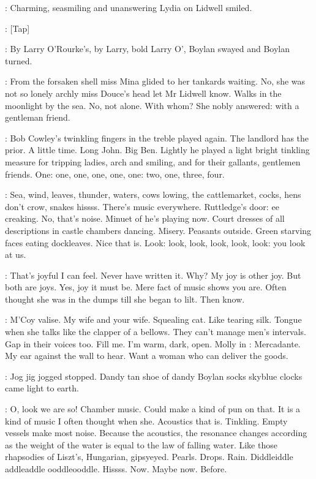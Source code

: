 :
Charming,
seasmiling and unanswering
Lydia on Lidwell smiled.

\stripling:
[Tap]

:
By Larry O'Rourke's,
by Larry,
bold Larry O',
Boylan swayed and
Boylan turned.

:
From the forsaken shell miss Mina glided to her tankards waiting.
No,
she was not so lonely archly miss Douce's head let Mr Lidwell know.
Walks in the moonlight by the sea.
No,
not alone.
With whom?
She nobly
answered:
with a gentleman friend.

:
Bob Cowley's twinkling fingers in the treble played again.
The
landlord has the prior.
A little time.
Long John.
Big Ben.
Lightly he
played a light bright tinkling measure for tripping ladies,
arch and
smiling,
and for their gallants,
gentlemen friends.
One:
one,
one,
one,
one,
one:
two,
one,
three,
four.

\BloomInt:
Sea,
wind,
leaves,
thunder,
waters,
cows lowing,
the cattlemarket,
cocks,
hens don't crow,
snakes hissss.
There's music everywhere.
Ruttledge's door:
ee creaking.
No,
that's noise.
Minuet of
he's playing now.
Court dresses of all descriptions in castle chambers
dancing.
Misery.
Peasants outside.
Green starving faces eating
dockleaves.
Nice that is.
Look:
look,
look,
look,
look,
look:
you
look at us.

\BloomInt:
That's joyful I can feel.
Never have written it.
Why?
My joy is other
joy.
But both are joys.
Yes,
joy it must be.
Mere fact of music shows you
are.
Often thought she was in the dumps till she began to lilt.
Then
know.

\BloomInt:
M'Coy valise.
My wife and your wife.
Squealing cat.
Like tearing silk.
Tongue when she talks like the clapper of a bellows.
They can't manage
men's intervals.
Gap in their voices too.
Fill me.
I'm warm,
dark,
open.
Molly in :
Mercadante.
My ear against the wall to hear.
Want
a woman who can deliver the goods.

\BloomInt:
Jog jig jogged stopped.
Dandy tan shoe of dandy Boylan socks
skyblue clocks came light to earth.

\BloomInt:
O,
look we are so!
Chamber music.
Could make a kind of pun on
that.
It is a kind of music I often thought when she.
Acoustics that is.
Tinkling.
Empty vessels make most noise.
Because the acoustics,
the
resonance changes according as the weight of the water is equal to the law
of falling water.
Like those rhapsodies of Liszt's,
Hungarian,
gipsyeyed.
Pearls.
Drops.
Rain.
Diddleiddle addleaddle ooddleooddle.
Hissss.
Now.
Maybe now.
Before.


